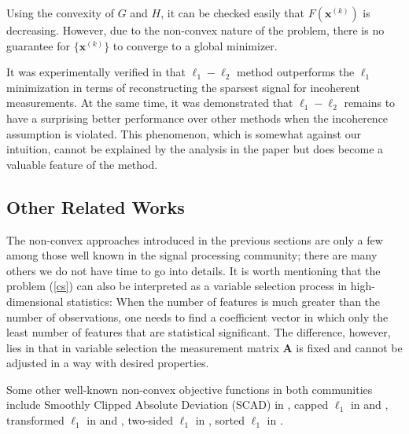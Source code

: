 \documentclass[11pt]{article}
\numberwithin{equation}{section}
\theoremstyle{plain}
\theoremstyle{definition}
\def\A{{\mathbf A}}
\def\x{{\mathbf x}}
\begin{document}
Using the convexity of $G$ and $H$, it can be checked easily that $F(\x^{(k)})$ is decreasing. However, due to the non-convex nature of the problem, there is no guarantee for $\{\x^{(k)}\}$ to converge to a global minimizer. 

It was experimentally verified in \cite{yin2015minimization} that $\ell_1-\ell_2$ method outperforms the $\ell_1$ minimization in terms of reconstructing the sparsest signal for incoherent measurements. At the same time, it was demonstrated that $\ell_1-\ell_2$ remains to have a surprising better performance over other methods when the incoherence assumption is violated. This phenomenon, which is somewhat against our intuition, cannot be explained by the analysis in the paper but does become a valuable feature of the method.   

\subsection{Other Related Works}

The non-convex approaches introduced in the previous sections are only a few among those well known in the signal processing community; there are many others we do not have time to go into details. It is worth mentioning that the problem (\ref{cs}) can also be interpreted as a variable selection process in high-dimensional statistics: When the number of features is much greater than the number of observations, one needs to find a coefficient vector in which only the least number of features that are statistical significant. The difference, however, lies in that in variable selection the measurement matrix $\A$ is fixed and cannot be adjusted in a way with desired properties.   

Some other well-known non-convex objective functions in both communities include Smoothly Clipped Absolute Deviation (SCAD) in \cite{fan2001variable}, capped $\ell_1$ in \cite{zhang2009multi} and \cite{shen2012likelihood}, 
transformed $\ell_1$ in \cite{lv2009unified} and \cite{zhang2014minimization}, 
two-sided $\ell_1$ in \cite{huang2015two}, sorted $\ell_1$ in \cite{huang2015nonconvex}.
\end{document}
